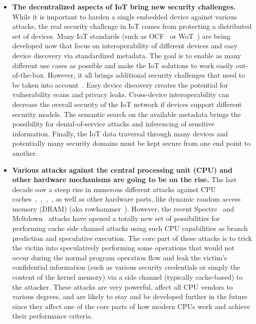 \begin{itemize}
	\item \textbf{The decentralized aspects of IoT bring new security challenges.} While it is important to harden a single embedded device against various attacks, the real security challenge in IoT comes from protecting a distributed set of devices. Many IoT standards (such as OCF~\cite{ocf} or WoT~\cite{wot}) are being developed now that focus on interoperability of different devices and easy device discovery via standardized metadata. The goal is to enable as many different use cases as possible and make the IoT solutions to work easily out-of-the-box. However, it all brings additional security challenges that need to be taken into account~\cite{McCool2018}. Easy device discovery creates the potential for vulnerability scans and privacy leaks. Cross-device interoperability can decrease the overall security of the IoT network if devices support different security models. The semantic search on the available metadata brings the possibility for denial-of-service attacks and inferencing of sensitive information. Finally, the IoT data traversal through many devices and potentially many security domains must be kept secure from one end point to another.
	
	\item \textbf{Various attacks against the central processing unit (CPU) and other hardware mechanisms are going to be on the rise.} The last decade saw a steep rise in numerous different attacks against CPU caches~\cite{lipp2016armageddon},~\cite{brasser2017software},~\cite{gras2017aslr},~\cite{irazoqui2017cache}, as well as other hardware parts, like dynamic random access memory (DRAM) (aka rowhammer~\cite{seaborn2015exploiting}). However, the recent Spectre~\cite{Kocher2018spectre} and Meltdown~\cite{Lipp2018meltdown} attacks have opened a totally new set of possibilities for performing cache side channel attacks using such CPU capabilities as branch prediction and speculative execution. The core part of these attacks is to trick the victim into speculatively performing some operations that would not occur during the normal program operation flow and leak the victim's confidential information (such as various security credentials or simply the content of the kernel memory) via a side channel (typically cache-based) to the attacker. These attacks are very powerful, affect all CPU vendors to various degrees, and are likely to stay and be developed further in the future since they affect one of the core parts of how modern CPUs work and achieve their performance criteria. 		
	

\end{itemize}
